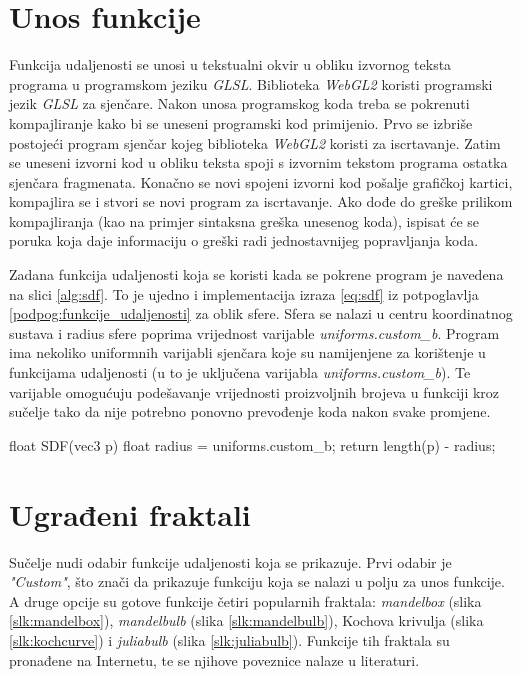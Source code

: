 \documentclass[zavrsnirad, upload]{fer}
\newenvironment{code}[2]{
    \def\codecaption{#1}
    \def\codelabel{#2}
    \figure[h]
    \centering
    \mdframed[linewidth=0.8pt]
    \footnotesize
    \verbatim
}{
    \endverbatim
    \endmdframed
    \caption{\codecaption}
    \label{\codelabel}
    \endfigure
}
\begin{document}
\newpage{}

\section{Unos funkcije}
\label{podpog:unos_funkcije}

Funkcija udaljenosti se unosi u tekstualni okvir u obliku izvornog teksta programa u programskom jeziku \emph{GLSL}. Biblioteka \emph{WebGL2} koristi programski jezik \emph{GLSL} za sjenčare. Nakon unosa programskog koda treba se pokrenuti kompajliranje kako bi se uneseni programski kod primijenio. Prvo se izbriše postojeći program sjenčar kojeg biblioteka \emph{WebGL2} koristi za iscrtavanje. Zatim se uneseni izvorni kod u obliku teksta spoji s izvornim tekstom programa ostatka sjenčara fragmenata. Konačno se novi spojeni izvorni kod pošalje grafičkoj kartici, kompajlira se i stvori se novi program za iscrtavanje. Ako dođe do greške prilikom kompajliranja (kao na primjer sintaksna greška unesenog koda), ispisat će se poruka koja daje informaciju o greški radi jednostavnijeg popravljanja koda. 

Zadana funkcija udaljenosti koja se koristi kada se pokrene program je navedena na slici \ref{alg:sdf}. To je ujedno i implementacija izraza \ref{eq:sdf} iz potpoglavlja \ref{podpog:funkcije_udaljenosti} za oblik sfere. Sfera se nalazi u centru koordinatnog sustava i radius sfere poprima vrijednost varijable \emph{uniforms.custom\_b}. Program ima nekoliko uniformnih varijabli sjenčara koje su namijenjene za korištenje u funkcijama udaljenosti (u to je uključena varijabla \emph{uniforms.custom\_b}). Te varijable omogućuju podešavanje vrijednosti proizvoljnih brojeva u funkciji kroz sučelje tako da nije potrebno ponovno prevođenje koda nakon svake promjene.

\begin{code}{Funkcija udaljenosti koja opisuje sferu}{alg:sdf}
float SDF(vec3 p) {
    float radius = uniforms.custom_b;
    return length(p) - radius;
}
\end{code}

\newpage{}

\section{Ugrađeni fraktali}
\label{podpog:ugradjeni_fraktali}

Sučelje nudi odabir funkcije udaljenosti koja se prikazuje. Prvi odabir je \emph{"Custom"}, što znači da prikazuje funkciju koja se nalazi u polju za unos funkcije. A druge opcije su gotove funkcije četiri popularnih fraktala: \emph{mandelbox} \cite{mandelbox} (slika \ref{slk:mandelbox}), \emph{mandelbulb} \cite{mandelbulb} (slika \ref{slk:mandelbulb}), Kochova krivulja \cite{kochcurve} (slika \ref{slk:kochcurve}) i \emph{juliabulb} \cite{juliabulb} (slika \ref{slk:juliabulb}). Funkcije tih fraktala su pronađene na Internetu, te se njihove poveznice nalaze u literaturi.
\end{document}

